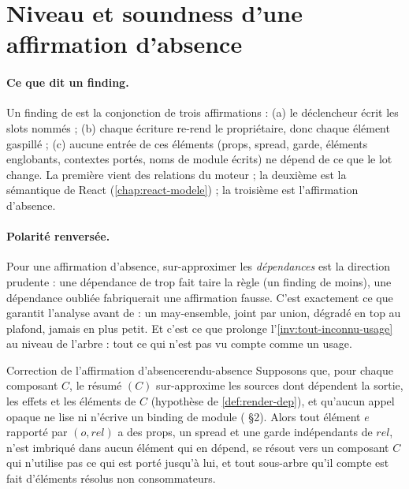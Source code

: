 \section{Niveau et soundness d'une affirmation d'absence}
\label{sec:regles-rendu-rsc-soundness}

\paragraph{Ce que dit un finding.} Un finding de  est la conjonction
de trois affirmations : (a) le déclencheur écrit les slots nommés ; (b) chaque écriture re-rend le
propriétaire, donc chaque élément gaspillé ; (c) aucune entrée de ces éléments (props, spread,
garde, éléments englobants, contextes portés, noms de module écrits) ne dépend de ce que le lot
change. La première vient des relations du moteur ; la deuxième est la sémantique de React
(\cref{chap:react-modele}) ; la troisième est l'affirmation d'absence.

\paragraph{Polarité renversée.} Pour une affirmation d'absence, sur-approximer les
\emph{dépendances} est la direction prudente : une dépendance de trop fait taire la règle (un
finding de moins), une dépendance oubliée fabriquerait une affirmation fausse. C'est exactement ce
que garantit l'analyse avant de  : un may-ensemble, joint par union, dégradé
en top au plafond, jamais en plus petit. Et c'est ce que prolonge l'\cref{inv:tout-inconnu-usage}
au niveau de l'arbre : tout ce qui n'est pas vu compte comme un usage.

\begin{theoreme}{Correction de l'affirmation d'absence}{rendu-absence}
Supposons que, pour chaque composant $C$, le résumé $(C)$ sur-approxime les
sources dont dépendent la sortie, les effets et les éléments de $C$ (hypothèse de
\cref{def:render-dep}), et qu'aucun appel opaque ne lise ni n'écrive un binding de module
( §2). Alors tout élément $e$ rapporté par $(o, \mathit{rel})$ a
des props, un spread et une garde indépendants de $\mathit{rel}$, n'est imbriqué dans aucun élément
qui en dépend, se résout vers un composant $C$ qui n'utilise pas ce qui est porté jusqu'à lui, et
tout sous-arbre qu'il compte est fait d'éléments résolus non consommateurs.
\end{theoreme}

